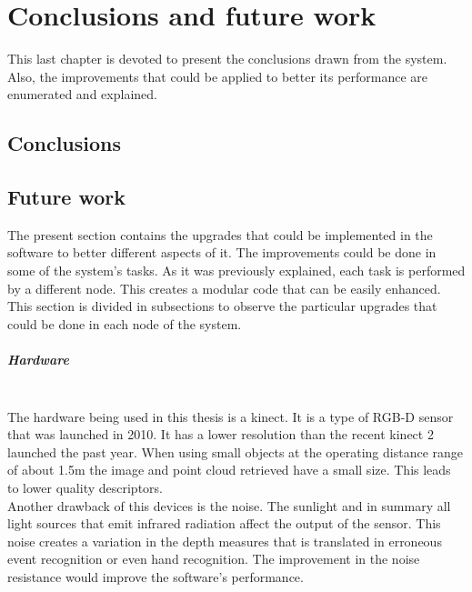 \chapter{Conclusions and future work}
\label{conclusions}

This last chapter is devoted to present the conclusions drawn from the system. 
Also, the improvements that could be applied to better its performance are enumerated and explained. 

	\section{Conclusions}




	\section{Future work}

	The present section contains the upgrades that could be implemented in the software to better different aspects of it. 
	The improvements could be done in some of the system's tasks.
	As it was previously explained, each task is performed by a different node. 
	This creates a modular code that can be easily enhanced. 
	\\

	This section is divided in subsections to observe the particular upgrades that could be done in each node of the system. 

	\paragraph{Hardware}\mbox{}\\

	The hardware being used in this thesis is a kinect. 
	It is a type of RGB-D sensor that was launched in 2010. 
	It has a lower resolution than the recent kinect 2 launched the past year. 
	When using small objects at the operating distance range of about 1.5m the image and point cloud retrieved have a small size. 
	This leads to lower quality descriptors.
	\\

	Another drawback of this devices is the noise. 
	The sunlight and in summary all light sources that emit infrared radiation affect the output of the sensor. 
	This noise creates a variation in the depth measures that is translated in erroneous event recognition or even hand recognition. 
	The improvement in the noise resistance would improve the software's performance. 


